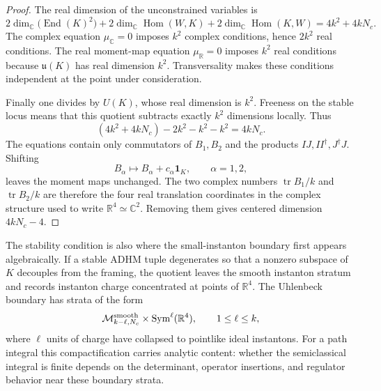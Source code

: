 \begin{proof}
The real dimension of the unconstrained variables is
\[
  2\dim_\mathbb C\bigl(\operatorname{End}(K)^2\bigr)
  +
  2\dim_\mathbb C\operatorname{Hom}(W,K)
  +
  2\dim_\mathbb C\operatorname{Hom}(K,W)
  =
  4k^2+4kN_c .
\]
The complex equation \(\mu_{\mathbb C}=0\) imposes \(k^2\) complex
conditions, hence \(2k^2\) real conditions.  The real moment-map equation
\(\mu_{\mathbb R}=0\) imposes \(k^2\) real conditions because
\(\mathfrak u(K)\) has real dimension \(k^2\).  Transversality makes these
conditions independent at the point under consideration.

Finally one divides by \(U(K)\), whose real dimension is \(k^2\).  Freeness
on the stable locus means that this quotient subtracts exactly \(k^2\)
dimensions locally.  Thus
\[
  (4k^2+4kN_c)-2k^2-k^2-k^2=4kN_c .
\]
The equations contain only commutators of \(B_1,B_2\) and the products
\(IJ,II^\dagger,J^\dagger J\).  Shifting
\[
  B_\alpha\longmapsto B_\alpha+c_\alpha\mathbf 1_K,
  \qquad \alpha=1,2,
\]
leaves the moment maps unchanged.  The two complex numbers
\(\operatorname{tr}B_1/k\) and \(\operatorname{tr}B_2/k\) are therefore the
four real translation coordinates in the complex structure used to write
\(\mathbb R^4\simeq\mathbb C^2\).  Removing them gives centered dimension
\(4kN_c-4\).
\end{proof}

The stability condition is also where the small-instanton boundary first
appears algebraically.  If a stable ADHM tuple degenerates so that a nonzero
subspace of \(K\) decouples from the framing, the quotient leaves the smooth
instanton stratum and records instanton charge concentrated at points of
\(\mathbb R^4\).  The Uhlenbeck boundary has strata of the form
\[
  \mathcal M_{k-\ell,N_c}^{\rm smooth}
  \times
  \operatorname{Sym}^{\ell}(\mathbb R^4),
  \qquad 1\le \ell\le k,
\]
where \(\ell\) units of charge have collapsed to pointlike ideal instantons.
For a path integral this compactification carries analytic content: whether the
semiclassical integral is finite depends on the determinant, operator
insertions, and regulator behavior near these boundary strata.

